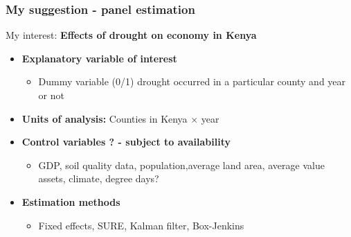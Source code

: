 \documentclass{beamer}              %
\begin{document}










\begin{frame}

\frametitle{My suggestion - panel estimation}\label{MySuggestion3} 

My interest: \textbf{Effects of drought on economy in Kenya}
\begin{itemize}


\item \textbf{Explanatory variable of interest}

\begin{itemize}
\item Dummy variable (0/1) drought occurred in a particular county and year or not

\end{itemize}


\item \textbf{Units of analysis:} Counties in Kenya $\times$ year

\item \textbf{Control variables ? - subject to availability}

\begin{itemize}
\item GDP, soil quality data, population,average land area, average value assets,  climate, degree days?
\end{itemize}

\item \textbf{Estimation methods}

\begin{itemize}
\item Fixed effects, SURE, Kalman filter, Box-Jenkins
\end{itemize}



\end{itemize}

\end{frame}
\end{document}
